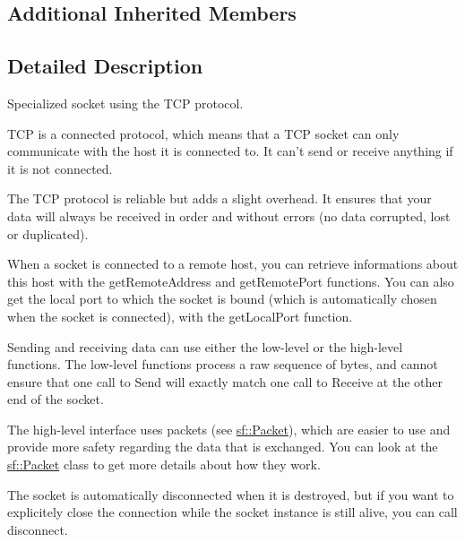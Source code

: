 \subsection*{Additional Inherited Members}


\subsection{Detailed Description}
Specialized socket using the T\-C\-P protocol. 

T\-C\-P is a connected protocol, which means that a T\-C\-P socket can only communicate with the host it is connected to. It can't send or receive anything if it is not connected.

The T\-C\-P protocol is reliable but adds a slight overhead. It ensures that your data will always be received in order and without errors (no data corrupted, lost or duplicated).

When a socket is connected to a remote host, you can retrieve informations about this host with the get\-Remote\-Address and get\-Remote\-Port functions. You can also get the local port to which the socket is bound (which is automatically chosen when the socket is connected), with the get\-Local\-Port function.

Sending and receiving data can use either the low-\/level or the high-\/level functions. The low-\/level functions process a raw sequence of bytes, and cannot ensure that one call to Send will exactly match one call to Receive at the other end of the socket.

The high-\/level interface uses packets (see \hyperlink{classsf_1_1Packet}{sf\-::\-Packet}), which are easier to use and provide more safety regarding the data that is exchanged. You can look at the \hyperlink{classsf_1_1Packet}{sf\-::\-Packet} class to get more details about how they work.

The socket is automatically disconnected when it is destroyed, but if you want to explicitely close the connection while the socket instance is still alive, you can call disconnect.

